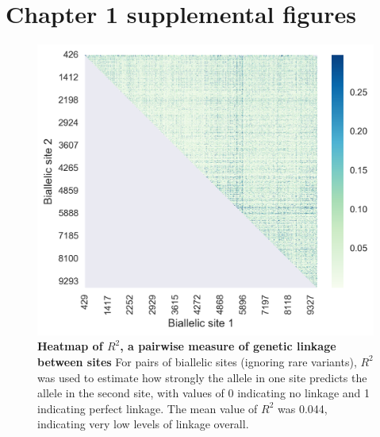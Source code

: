 \chapter{Chapter 1 supplemental figures}

\begin{figure}[h!]
  \begin{centering}
    \includegraphics[width=.8\linewidth]{./png/siv_linkage.png}
  	\caption[Heatmap of $R^2$, a pairwise measure of genetic linkage between sites]{\textbf{Heatmap of $R^2$, a pairwise measure of genetic linkage between sites }
For pairs of biallelic sites (ignoring rare variants), $R^2$ was used to estimate how strongly the allele in one site predicts the allele in the second site, with values of 0 indicating no linkage and 1 indicating perfect linkage.
The mean value of $R^2$ was 0.044, indicating very low levels of linkage overall.
        }
  	\label{siv_linkage}
  \end{centering}
\end{figure}

